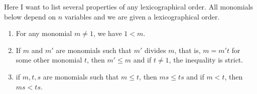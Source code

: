 \begin{remarks}
Here I want to list several properties of any lexicographical order.
All monomials below depend on $n$ variables and we are given a lexicographical order.
\begin{enumerate}
\item For any monomial $m\neq 1$, we have $1 < m$.

\item If $m$ and $m'$ are monomials such that $m'$ divides $m$, that is, $m = m' t$ for some other monomial $t$, then $m' \leqslant m$ and if $t\neq 1$, the inequality is strict.

\item if $m, t, s$ are monomials such that $m \leqslant t$, then $ms \leqslant ts$ and if $m < t$, then $ms < ts$.

\end{enumerate}
\end{remarks}



